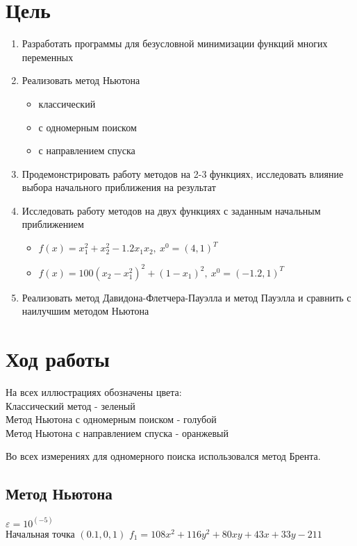 \section{Цель}
\begin{enumerate}
	\item Разработать программы для безусловной минимизации функций
	многих переменных
	\item Реализовать метод Ньютона
		\begin{itemize}
			\item классический
			\item с одномерным поиском
			\item с направлением спуска
		\end{itemize}
	\item Продемонстрировать работу методов на 2-3 функциях, исследовать влияние выбора начального приближения на результат
	\item Исследовать работу методов на двух функциях с заданным начальным приближением
		\begin{itemize}
			\item \(f(x) = x_1^2 + x_2^2 - 1.2x_1x_2,\ x^0 = (4, 1)^T\)
			\item \(f(x) = 100(x_2 - x_1^2)^2 + (1 - x_1)^2,\ x^0 = (-1.2, 1)^T\)	
		\end{itemize}
	\item Реализовать метод Давидона-Флетчера-Пауэлла и метод Пауэлла и сравнить с наилучшим методом Ньютона
\end{enumerate}

\section{Ход работы}

На всех иллюстрациях обозначены цвета:\\
Классический метод - зеленый\\
Метод Ньютона с одномерным поиском - голубой\\
Метод Ньютона с направлением спуска - оранжевый

Во всех измерениях для одномерного поиска использовался метод Брента.

\subsection{Метод Ньютона}

\(\varepsilon = 10^(-5)\)\\
Начальная точка $(0.1, 0,1)$
\(f_1 = 108x^2 + 116y^2 + 80xy + 43x + 33y - 211\)\\

